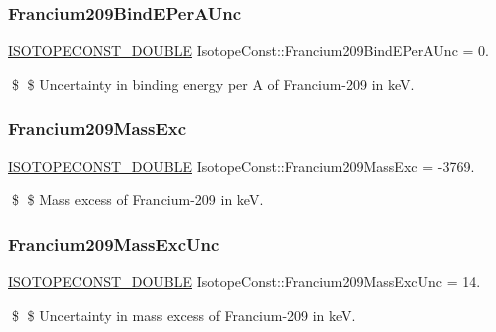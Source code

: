 \subsubsection{\texorpdfstring{Francium209\+Bind\+E\+Per\+A\+Unc}{Francium209BindEPerAUnc}}
{\footnotesize\ttfamily \mbox{\hyperlink{group___isotope_const-_macros_ga8f45a7272ce02c0b4c65c44636ed719a}{I\+S\+O\+T\+O\+P\+E\+C\+O\+N\+S\+T\+\_\+\+D\+O\+U\+B\+LE}} Isotope\+Const\+::\+Francium209\+Bind\+E\+Per\+A\+Unc = 0.}

\$ \$ Uncertainty in binding energy per A of Francium-\/209 in keV. \mbox{\label{group___isotope_const-_francium-_fr209_ga155d8421fab30246543cfd4aa741fe16}} 
\subsubsection{\texorpdfstring{Francium209\+Mass\+Exc}{Francium209MassExc}}
{\footnotesize\ttfamily \mbox{\hyperlink{group___isotope_const-_macros_ga8f45a7272ce02c0b4c65c44636ed719a}{I\+S\+O\+T\+O\+P\+E\+C\+O\+N\+S\+T\+\_\+\+D\+O\+U\+B\+LE}} Isotope\+Const\+::\+Francium209\+Mass\+Exc = -\/3769.}

\$ \$ Mass excess of Francium-\/209 in keV. \mbox{\label{group___isotope_const-_francium-_fr209_ga051a91470846f703bb310546c4f1cee6}} 
\subsubsection{\texorpdfstring{Francium209\+Mass\+Exc\+Unc}{Francium209MassExcUnc}}
{\footnotesize\ttfamily \mbox{\hyperlink{group___isotope_const-_macros_ga8f45a7272ce02c0b4c65c44636ed719a}{I\+S\+O\+T\+O\+P\+E\+C\+O\+N\+S\+T\+\_\+\+D\+O\+U\+B\+LE}} Isotope\+Const\+::\+Francium209\+Mass\+Exc\+Unc = 14.}

\$ \$ Uncertainty in mass excess of Francium-\/209 in keV. \mbox{\label{group___isotope_const-_francium-_fr209_ga0d3ca68c744687aa2be04fc7b8cb03d6}} 
